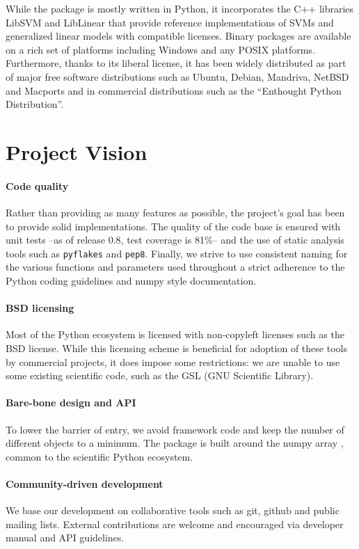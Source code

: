 \documentclass[twoside,11pt]{article}
\begin{document}
While the package is mostly written in Python, it incorporates the C++
libraries LibSVM \citep{chang2001} and LibLinear \citep{fan2008} that
provide reference implementations of SVMs and generalized linear models
with compatible licenses.
%
Binary packages are available on a rich set of platforms including
Windows and any POSIX platforms. Furthermore, thanks to its liberal
license, it has been widely distributed as part
of major free software distributions such as Ubuntu, Debian, Mandriva,
NetBSD and Macports and in commercial distributions such as the ``Enthought
Python Distribution''.


\section{Project Vision}

\paragraph{Code quality}
%
Rather than providing as many features as possible, the project's goal has been to provide solid
implementations. The quality of the code base is ensured with unit
tests --as of release 0.8, test coverage is 81\%-- and the use of static
analysis tools such as {\tt pyflakes} and {\tt pep8}. Finally, we
strive to use consistent naming for the various functions and
parameters used throughout a strict adherence to the Python coding
guidelines and numpy style documentation.

\paragraph{BSD licensing}
%
Most of the Python ecosystem is licensed with non-copyleft licenses such
as the BSD license. While this licensing scheme is beneficial for adoption
of these tools by commercial
projects, it does impose some restrictions: we are unable to use some existing
scientific code, such as the GSL (GNU Scientific Library).

\paragraph{Bare-bone design and API}
%
To lower the barrier of entry, we avoid framework code and keep the number
of different objects to a minimum.
The package is built
around the numpy array \citep{Vanderwalt2011}, common to the
scientific Python ecosystem.

\paragraph{Community-driven development}
%
We base our development on collaborative tools such as git, github and
public mailing lists. External contributions are welcome and
encouraged via developer manual and API guidelines.
\end{document}
